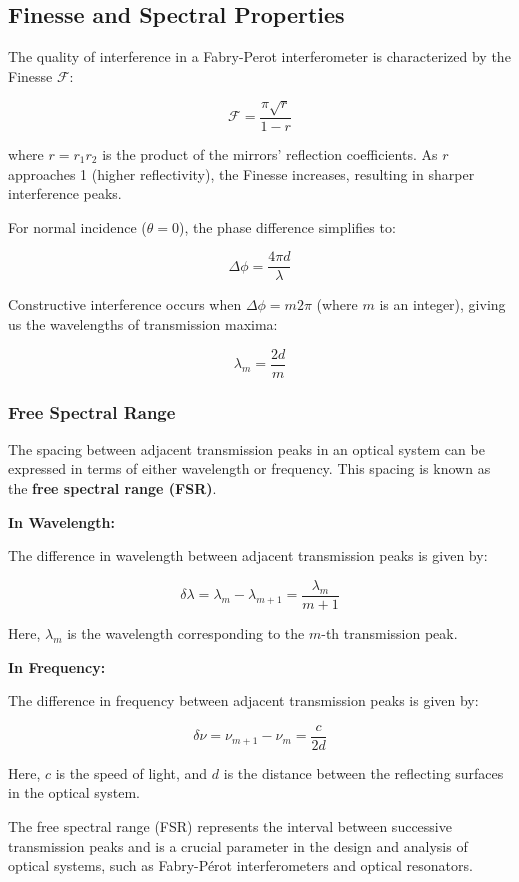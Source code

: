 \documentclass[
  a4paper,
]{book}
\begin{document}
\subsection{Finesse and Spectral
Properties}\label{finesse-and-spectral-properties}

The quality of interference in a Fabry-Perot interferometer is
characterized by the Finesse \(\mathcal{F}\):

\[
\mathcal{F}=\frac{\pi \sqrt{r}}{1-r}
\]

where \(r=r_1r_2\) is the product of the mirrors' reflection
coefficients. As \(r\) approaches 1 (higher reflectivity), the Finesse
increases, resulting in sharper interference peaks.

For normal incidence (\(\theta=0\)), the phase difference simplifies to:

\[
\Delta\phi=\frac{4\pi d}{\lambda}
\]

Constructive interference occurs when \(\Delta\phi=m2\pi\) (where \(m\)
is an integer), giving us the wavelengths of transmission maxima:

\[
\lambda_m=\frac{2d}{m}
\]

\subsubsection{Free Spectral Range}\label{free-spectral-range}

The spacing between adjacent transmission peaks in an optical system can
be expressed in terms of either wavelength or frequency. This spacing is
known as the \textbf{free spectral range (FSR)}.

\textbf{In Wavelength:}

The difference in wavelength between adjacent transmission peaks is
given by:

\[
   \delta \lambda = \lambda_{m} - \lambda_{m+1} = \frac{\lambda_m}{m+1}
   \]

Here, \(\lambda_m\) is the wavelength corresponding to the \(m\)-th
transmission peak.

\textbf{In Frequency:}

The difference in frequency between adjacent transmission peaks is given
by:

\[
   \delta \nu = \nu_{m+1} - \nu_m = \frac{c}{2d}
   \]

Here, \(c\) is the speed of light, and \(d\) is the distance between the
reflecting surfaces in the optical system.

The free spectral range (FSR) represents the interval between successive
transmission peaks and is a crucial parameter in the design and analysis
of optical systems, such as Fabry-Pérot interferometers and optical
resonators.
\end{document}
